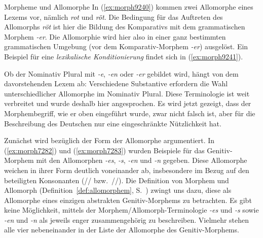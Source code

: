 \begin{Vertiefung}{Morpheme und Allomorphe}
In (\ref{ex:morph9240}) kommen zwei Allomorphe eines Lexems vor, nämlich \textit{rot} und \textit{röt}.
Die Bedingung für das Auftreten des Allomorphs \textit{röt} ist hier die Bildung des Komparativs mit dem grammatischen Morphem \textit{-er}.
Die Allomorphie wird hier also in einer ganz bestimmten grammatischen Umgebung (vor dem Komparativ-Morphem \textit{-er}) ausgelöst.
Ein Beispiel für eine \textit{lexikalische Konditionierung} findet sich in (\ref{ex:morph9241}).

\begin{exe}
  \ex \label{ex:morph9241}
  \begin{xlist}
  \end{xlist}
\end{exe}

Ob der Nominativ Plural mit \textit{-e}, \textit{-en} oder \textit{-er} gebildet wird, hängt von dem davorstehenden Lexem ab:
Verschiedene Substantive erfordern die Wahl unterschiedlicher Allomorphe im Nominativ Plural.
Diese Terminologie ist weit verbreitet und wurde deshalb hier angesprochen.
Es wird jetzt gezeigt, dass der Morphembegriff, wie er oben eingeführt wurde, zwar nicht falsch ist, aber für die Beschreibung des Deutschen nur eine eingeschränkte Nützlichkeit hat.

Zunächst wird bezüglich der Form der Allomorphe argumentiert. 
In (\ref{ex:morph7282}) und (\ref{ex:morph7283}) wurden Beispiele für das Genitiv-Morphem mit den Allomorphen \textit{-es}, \textit{-s}, \textit{-en} und \textit{-n} gegeben.
Diese Allomorphe weichen in ihrer Form deutlich voneinander ab, insbesondere im Bezug auf den beteiligten Konsonanten (// bzw.\ //).
Die Definition von Morphem und Allomorph (Definition~\ref{def:allomorphem}, S.~\pageref{def:allomorphem}) zwingt uns dazu, diese als Allomorphe eines einzigen abstrakten Genitiv-Morphems zu betrachten.
Es gibt keine Möglichkeit, mittels der Morphem\slash Allomorph-Terminologie \textit{-es} und \textit{-s} sowie \textit{-en} und \textit{-n} als jeweils enger zusammengehörig zu beschreiben.
Vielmehr stehen alle vier nebeneinander in der Liste der Allomorphe des Genitiv-Morphems.


\end{Vertiefung}
